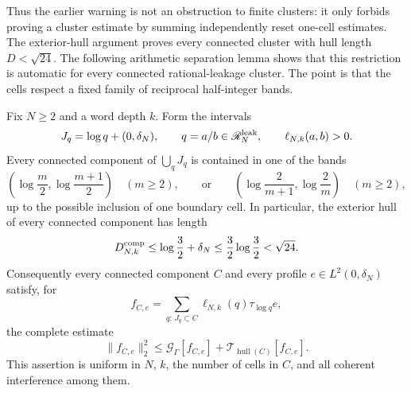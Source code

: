 Thus the earlier warning is not an obstruction to finite clusters: it only
forbids proving a cluster estimate by summing independently reset one-cell
estimates.  The exterior-hull argument proves every connected cluster with
hull length $D<\sqrt{24}$.  The following arithmetic separation lemma shows
that this restriction is automatic for every connected rational-leakage
cluster.  The point is that the cells respect a fixed family of reciprocal
half-integer bands.

\begin{theorem}
\label{thm:newdHalfIntegerBands}
Fix $N\geq2$ and a word depth $k$.  Form the intervals
\[
 J_q=\log q+(0,\delta_N),
 \qquad
 q=a/b\in\mathscr R_N^{\rm leak},
 \qquad \ell_{N,k}(a,b)>0.
\]
Every connected component of $\bigcup_qJ_q$ is contained in one of the
bands
\begin{equation}\label{eq:newdArithmeticBands}
 \left(\log\frac m2,\log\frac{m+1}{2}\right)
 \quad(m\geq2),
 \qquad\text{or}\qquad
 \left(\log\frac2{m+1},\log\frac2m\right)
 \quad(m\geq2),
\end{equation}
up to the possible inclusion of one boundary cell.  In particular, the
exterior hull of every connected component has length
\begin{equation}\label{eq:newdUniformClusterDiameter}
 D_{N,k}^{\rm comp}
 \leq \log\frac32+\delta_N
 \leq\frac32\log\frac32
 <\sqrt{24}.
\end{equation}
Consequently every connected component $C$ and every profile
$e\in L^2(0,\delta_N)$ satisfy, for
\[
 f_{C,e}=\sum_{q:\,J_q\subset C}
          \ell_{N,k}(q)\tau_{\log q}e,
\]
the complete estimate
\begin{equation}\label{eq:newdEveryConnectedClusterPaid}
 \|f_{C,e}\|_2^2
 \leq\mathcal G_\Gamma[f_{C,e}]
      +\mathcal T_{\operatorname{hull}(C)}[f_{C,e}].
\end{equation}
This assertion is uniform in $N$, $k$, the number of cells in $C$, and
all coherent interference among them.
\end{theorem}

